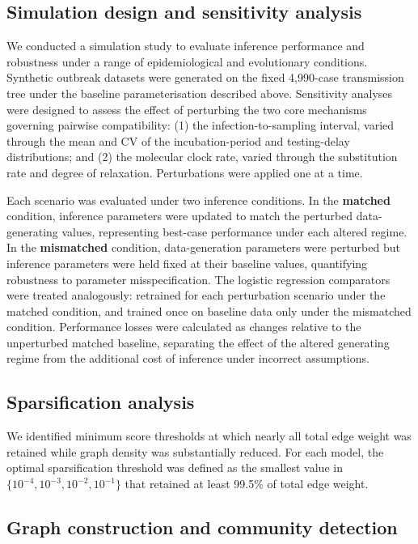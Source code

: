\documentclass[10pt,letterpaper]{article}
\begin{document}
\subsection*{Simulation design and sensitivity analysis}

We conducted a simulation study to evaluate inference performance and robustness under a range of epidemiological and evolutionary conditions. Synthetic outbreak datasets were generated on the fixed 4{,}990-case transmission tree under the baseline parameterisation described above. Sensitivity analyses were designed to assess the effect of perturbing the two core mechanisms governing pairwise compatibility: (1) the infection-to-sampling interval, varied through the mean and CV of the incubation-period and testing-delay distributions; and (2) the molecular clock rate, varied through the substitution rate and degree of relaxation. Perturbations were applied one at a time.

Each scenario was evaluated under two inference conditions. In the \textbf{matched} condition, inference parameters were updated to match the perturbed data-generating values, representing best-case performance under each altered regime. In the \textbf{mismatched} condition, data-generation parameters were perturbed but inference parameters were held fixed at their baseline values, quantifying robustness to parameter misspecification. The logistic regression comparators were treated analogously: retrained for each perturbation scenario under the matched condition, and trained once on baseline data only under the mismatched condition. Performance losses were calculated as changes relative to the unperturbed matched baseline, separating the effect of the altered generating regime from the additional cost of inference under incorrect assumptions.

\subsection*{Sparsification analysis}

We identified minimum score thresholds at which nearly all total edge weight was retained while graph density was substantially reduced. For each model, the optimal sparsification threshold was defined as the smallest value in $\{10^{-4}, 10^{-3}, 10^{-2}, 10^{-1}\}$ that retained at least 99.5\% of total edge weight.

\subsection*{Graph construction and community detection}
\end{document}
